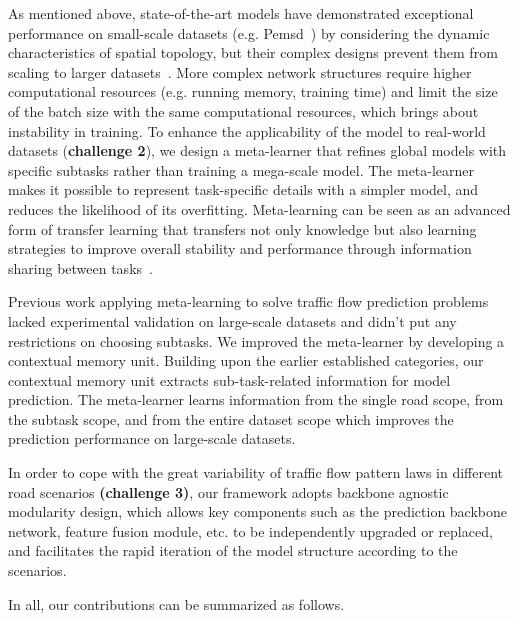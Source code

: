 \documentclass[lettersize,journal]{IEEEtran}
\begin{document}
As mentioned above, state-of-the-art models have demonstrated exceptional performance on small-scale datasets (e.g. Pemsd~\cite{PeMSD}) by considering the dynamic characteristics of spatial topology, but their complex designs prevent them from scaling to larger datasets~\cite{largest}. More complex network structures require higher computational resources (e.g. running memory, training time) and limit the size of the batch size with the same computational resources, which brings about instability in training. To enhance the applicability of the model to real-world datasets (\textbf{challenge 2}), we design a meta-learner that refines global models with specific subtasks rather than training a mega-scale model. The meta-learner makes it possible to represent task-specific details with a simpler model, and reduces the likelihood of its overfitting. Meta-learning can be seen as an advanced form of transfer learning that transfers not only knowledge but also learning strategies to improve overall stability and performance through information sharing between tasks~\cite{DBLP:journals/corr/FinnAL17}.

Previous work applying meta-learning to solve traffic flow prediction problems~\cite{pan_urban_2019}~\cite{zhang_efficient_2022}~\cite{wang_deep_2022} lacked experimental validation on large-scale datasets and didn't put any restrictions on choosing subtasks. We improved the meta-learner by developing a contextual memory unit. Building upon the earlier established categories, our contextual memory unit extracts sub-task-related information for model prediction. The meta-learner learns information from the single road scope, from the subtask scope, and from the entire dataset scope which improves the prediction performance on large-scale datasets.


In order to cope with the great variability of traffic flow pattern laws in different road scenarios \textbf{(challenge 3)}, our framework adopts backbone agnostic modularity design, which allows key components such as the prediction backbone network, feature fusion module, etc. to be independently upgraded or replaced, and facilitates the rapid iteration of the model structure according to the scenarios.

\color{black}
In all, our contributions can be summarized as follows.
		
\end{document}
